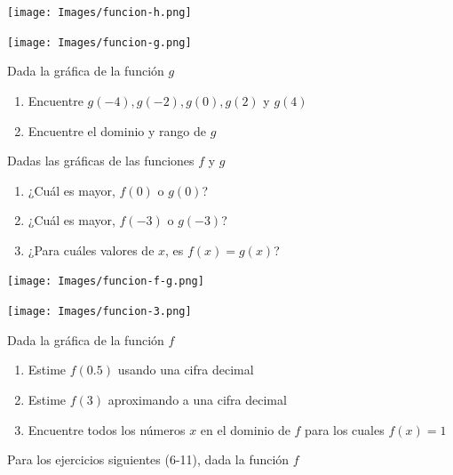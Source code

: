 \documentclass[10pt,twoside]{article}
\begin{document}
\begin{enumerate}
\begin{minipage}{.4\textwidth}
  \texttt{[image: Images/funcion-h.png]}
\end{minipage}
\begin{minipage}{.4\textwidth}
  \texttt{[image: Images/funcion-g.png]}
\end{minipage}\hfill
\begin{minipage}{.5\textwidth}
  \item Dada la gráfica de la función $ g $
  \begin{enumerate}
    \item Encuentre $ g(-4), g(-2), g(0), g(2) $ y $ g(4) $
    \item Encuentre el dominio y rango de $ g $
  \end{enumerate}
\end{minipage}
\begin{minipage}{.55\textwidth}
  \item Dadas las gráficas de las funciones $ f $ y $ g $
  \begin{enumerate}
    \item ¿Cuál es mayor, $ f(0) $ o $ g(0) $?
    \item ¿Cuál es mayor, $ f(-3) $ o $ g(-3) $?
    \item ¿Para cuáles valores de $ x $, es $ f(x)=g(x) $?
  \end{enumerate}
\end{minipage}\hfill
\begin{minipage}{.35\textwidth}
  \texttt{[image: Images/funcion-f-g.png]}
\end{minipage}
  \begin{minipage}{.4\textwidth}
    \texttt{[image: Images/funcion-3.png]}
  \end{minipage}\hfill
  \begin{minipage}{.5\textwidth}
    \item Dada la gráfica de la función $ f $
    \begin{enumerate}
      \item Estime $ f(0.5) $ usando una cifra decimal
      \item Estime $ f(3) $ aproximando a una cifra decimal
      \item Encuentre todos los números $ x $ en el dominio de $ f $ para los cuales $ f(x)=1 $
    \end{enumerate}
  \end{minipage}
  Para los ejercicios siguientes (6-11), dada la función $ f $
  \begin{itemize}

\end{itemize}
\end{enumerate}
\end{document}
